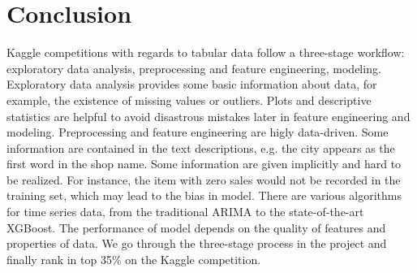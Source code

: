 \documentclass{article}
\begin{document}
\section{Conclusion}
Kaggle competitions with regards to tabular data follow a three-stage workflow: exploratory data analysis, preprocessing and feature engineering, modeling. Exploratory data analysis provides some basic information about data, for example, the existence of missing values or outliers. Plots and descriptive statistics are helpful to avoid disastrous mistakes later in feature engineering and modeling. Preprocessing and feature engineering are higly data-driven. Some information are contained in the text descriptions, e.g. the city appears as the first word in the shop name. Some information are given implicitly and hard to be realized. For instance, the item with zero sales would not be recorded in the training set, which may lead to the bias in model. There are various algorithms for time series data, from the traditional ARIMA to the state-of-the-art XGBoost. The performance of model depends on the quality of features and properties of data. We go through the three-stage process in the project and finally rank in top 35\% on the Kaggle competition.
\end{document}
